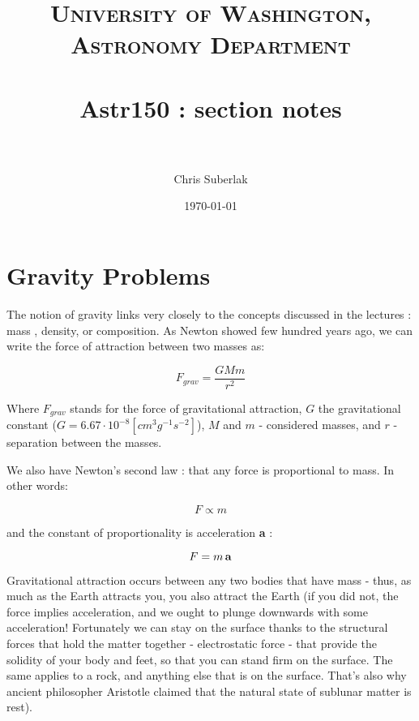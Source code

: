 \documentclass[paper=a4, fontsize=11pt]{scrartcl} %
\title{	
\normalfont \normalsize 
\textsc{University of Washington, Astronomy Department} \\ [25pt] 
\horrule{0.5pt} \\[0.4cm] %
\huge Astr150  : section notes \\ %
\horrule{2pt} \\[0.5cm] %
}
\author{Chris Suberlak}
\date{\normalsize\today}
\numberwithin{equation}{section} %
\begin{document}
\maketitle %


\section{Gravity Problems }

The notion of gravity links very closely to the concepts discussed in the lectures : mass , density, or composition. 
As Newton showed few hundred years ago, we can write the force of attraction between two masses as: 

\begin{equation}
 F_{grav} = \frac{G M m}{r^{2}}
 \label{eq:gravity}
\end{equation}

Where $F_{grav}$ stands for the force of gravitational attraction, $G$ the gravitational constant ($G = 6.67 \cdot 10^{-8} [cm^{3}g^{-1}s^{-2}]$), $M$ and $m$ - considered masses, and $r$ - separation between the masses. 

We also have Newton's second law  : that any force is proportional to mass. In other words: 

\begin{equation}
F \propto m
\end{equation}

and the constant of proportionality is acceleration \textbf{a} : 

\begin{equation}
\label{newtons}
F = m \, \bold{a}
\end{equation}

Gravitational attraction occurs between any two bodies that have mass - thus, as much as the Earth attracts you, you also attract the Earth (if you did not, the force implies acceleration, and we ought to plunge downwards with some acceleration! Fortunately we can stay on the surface thanks to the structural forces that hold the matter together - electrostatic force - that provide the solidity of your body and feet, so that you can stand firm on the surface. The same applies to a rock, and anything else that is on the surface. That's also why ancient philosopher Aristotle claimed that the natural state of sublunar matter is rest). 
\end{document}
